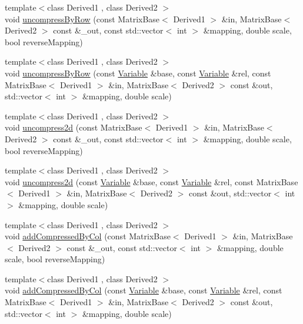 \begin{DoxyCompactItemize}
\item 
{\footnotesize template$<$class Derived1 , class Derived2 $>$ }\\void \hyperlink{namespaceocra_1_1utils_a151ee2cecba7ea9527fbdc8be061cd98}{uncompress\+By\+Row} (const Matrix\+Base$<$ Derived1 $>$ \&in, Matrix\+Base$<$ Derived2 $>$ const \&\+\_\+out, const std\+::vector$<$ int $>$ \&mapping, double scale, bool reverse\+Mapping)
\item 
{\footnotesize template$<$class Derived1 , class Derived2 $>$ }\\void \hyperlink{namespaceocra_1_1utils_aa1f9829f8b85e3b006b691a924b12e3f}{uncompress\+By\+Row} (const \hyperlink{classocra_1_1Variable}{Variable} \&base, const \hyperlink{classocra_1_1Variable}{Variable} \&rel, const Matrix\+Base$<$ Derived1 $>$ \&in, Matrix\+Base$<$ Derived2 $>$ const \&out, std\+::vector$<$ int $>$ \&mapping, double scale)
\item 
{\footnotesize template$<$class Derived1 , class Derived2 $>$ }\\void \hyperlink{namespaceocra_1_1utils_a6336653c4ed344718fdf1c888c668a58}{uncompress2d} (const Matrix\+Base$<$ Derived1 $>$ \&in, Matrix\+Base$<$ Derived2 $>$ const \&\+\_\+out, const std\+::vector$<$ int $>$ \&mapping, double scale, bool reverse\+Mapping)
\item 
{\footnotesize template$<$class Derived1 , class Derived2 $>$ }\\void \hyperlink{namespaceocra_1_1utils_a5189699a011acaa6413bd14c178254c3}{uncompress2d} (const \hyperlink{classocra_1_1Variable}{Variable} \&base, const \hyperlink{classocra_1_1Variable}{Variable} \&rel, const Matrix\+Base$<$ Derived1 $>$ \&in, Matrix\+Base$<$ Derived2 $>$ const \&out, std\+::vector$<$ int $>$ \&mapping, double scale)
\item 
{\footnotesize template$<$class Derived1 , class Derived2 $>$ }\\void \hyperlink{namespaceocra_1_1utils_a4a6965e28f8a5284f406ca2cea54a221}{add\+Compressed\+By\+Col} (const Matrix\+Base$<$ Derived1 $>$ \&in, Matrix\+Base$<$ Derived2 $>$ const \&\+\_\+out, const std\+::vector$<$ int $>$ \&mapping, double scale, bool reverse\+Mapping)
\item 
{\footnotesize template$<$class Derived1 , class Derived2 $>$ }\\void \hyperlink{namespaceocra_1_1utils_a8b6a78df5f205a61d8b4d29a2a82c864}{add\+Compressed\+By\+Col} (const \hyperlink{classocra_1_1Variable}{Variable} \&base, const \hyperlink{classocra_1_1Variable}{Variable} \&rel, const Matrix\+Base$<$ Derived1 $>$ \&in, Matrix\+Base$<$ Derived2 $>$ const \&out, std\+::vector$<$ int $>$ \&mapping, double scale)

\end{DoxyCompactItemize}

